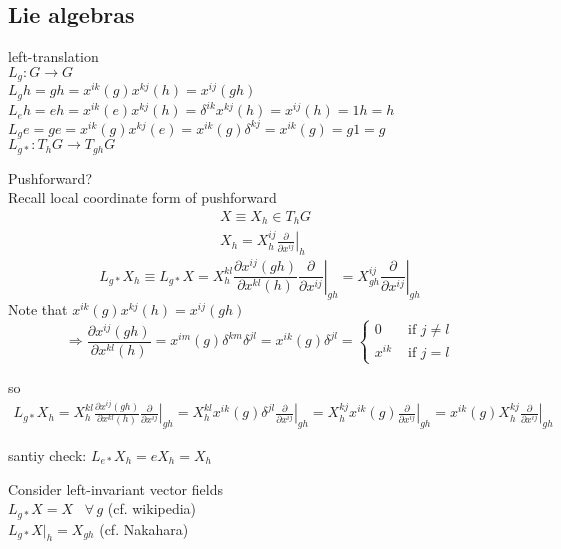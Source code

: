 \documentclass{book}
\begin{document}
\subsection{ Lie algebras }

left-translation  \\
$L_g:G \to G$ \\
$L_gh = gh = x^{ik}{(g)} x^{kj}{(h)} = x^{ij}{(gh)}$ \\
$L_eh = eh = x^{ik}{ (e)} x^{kj}{ (h)} = \delta^{ik} x^{kj}{(h)} = x^{ij}{(h)} = 1h = h$ \\
$L_ge = ge = x^{ik}{(g)}x^{kj}{(e)} = x^{ik}{(g)}  \delta^{kj} = x^{ik}{(g)} = g1 = g $ \\
$L_{g*} : T_hG \to T_{gh}G$

Pushforward?  \\
Recall local coordinate form of pushforward 
\[
\begin{aligned}
  & X \equiv X_h \in T_h G \\ 
  & X_h = X_h^{ij} \left. \frac{ \partial }{ \partial x^{ij} } \right|_h 
\end{aligned}
\]
\[
L_{g*}X_h \equiv L_{g*} X = X_h^{kl} \frac{ \partial x^{ij}{ (gh) } }{ \partial x^{kl}{(h)} } \left. \frac{ \partial }{ \partial x^{ij} } \right|_{gh} = X^{ij}_{gh} \left. \frac{ \partial }{ \partial x^{ij} } \right|_{gh}
\]
Note that $x^{ik}{ (g)} x^{kj}{ (h)} = x^{ij}{ (gh)}$
\[
\Longrightarrow \frac{ \partial x^{ij}{(gh)} }{ \partial x^{kl}{ (h)} } = x^{im}{(g)} \delta^{km} \delta^{jl} = x^{ik}{ (g)} \delta^{jl} = \begin{cases} 0 & \text{ if } j\neq l \\ x^{ik} & \text{ if } j =l \end{cases}
\]

so
\[
\begin{gathered}
  L_{g*} X_h = X_h^{kl} \frac{ \partial x^{ij}{(gh)} }{ \partial x^{kl}{(h)} } \left. \frac{ \partial }{ \partial x^{ij} } \right|_{gh} = X^{kl}_h x^{ik}{(g)} \delta^{jl} \left. \frac{ \partial }{ \partial x^{ij} } \right|_{gh} = X^{kj}_h x^{ik}{(g)} \left. \frac{ \partial }{ \partial x^{ij}} \right|_{gh} = x^{ik}{(g)} X^{kj}_h \left. \frac{ \partial }{ \partial x^{ij}} \right|_{gh}
\end{gathered}
\]

santiy check: $L_{e*}X_h = eX_h = X_h$

Consider left-invariant vector fields  \\
\quad $L_{g*} X = X$ \, $\forall \, g$ (cf. wikipedia) \\
\quad $L_{g*} \left. X \right|_h = X_{gh}$ (cf. Nakahara) \\
\end{document}
